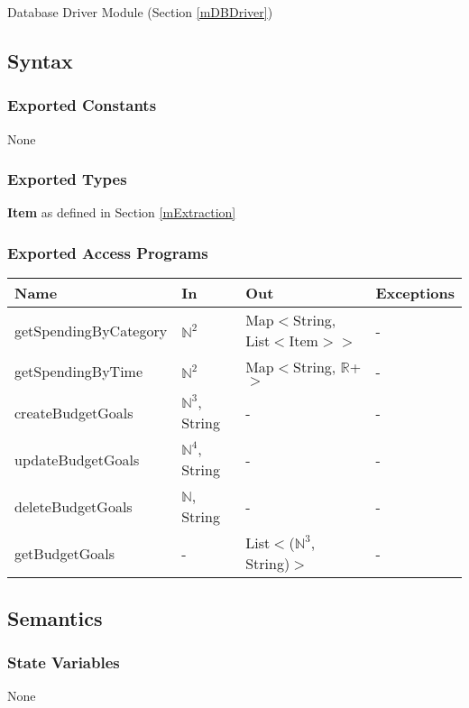 \documentclass[12pt, titlepage]{article}
\begin{document}
Database Driver Module (Section \ref{mDBDriver})

\subsection{Syntax}

\subsubsection{Exported Constants}
None

\subsubsection{Exported Types}

\textbf{Item} as defined in Section \ref{mExtraction}

\subsubsection{Exported Access Programs}

\begin{center}

\begin{tabular}{p{5cm} p{3cm} p{4cm} p{4cm}}
\hline
\textbf{Name} & \textbf{In} & \textbf{Out} & \textbf{Exceptions} \\
\hline
getSpendingByCategory & $\mathbb{N}^2$ & Map$<$String, List$<$Item$>$$>$  & - \\
getSpendingByTime & $\mathbb{N}^2$ & Map$<$String, $\mathbb{R}$+$>$ & - \\
createBudgetGoals & $\mathbb{N}^3$, String & - & - \\
updateBudgetGoals & $\mathbb{N}^4$, String & - & - \\
deleteBudgetGoals & $\mathbb{N}$, String & - & - \\
getBudgetGoals & - & List$<$($\mathbb{N}^3$, String)$>$ & - \\
\hline
\end{tabular}
\end{center}

\subsection{Semantics}

\subsubsection{State Variables}
None
\end{document}
